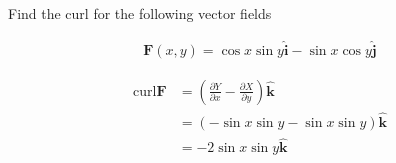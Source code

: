 Find the curl for the following vector fields

\begin{align*}
    \boldsymbol{F}(x, y) = \cos{x}\sin{y} \boldsymbol{\hat{i}} - \sin{x}\cos{y} \boldsymbol{\hat{j}}
\end{align*}

\begin{solution}
\begin{align*}
    \mathrm{curl}\boldsymbol{F} &= \left(\frac{\partial Y}{\partial x} - \frac{\partial X}{\partial y}\right) \boldsymbol{\hat{k}} \\
    &= \left(-\sin{x}\sin{y} - \sin{x}\sin{y}\right) \boldsymbol{\hat{k}} \\
    &= -2\sin{x}\sin{y} \boldsymbol{\hat{k}}
\end{align*}
\end{solution}